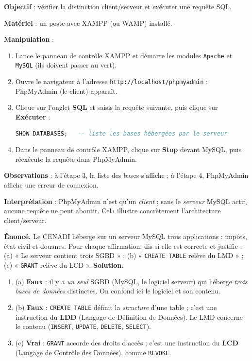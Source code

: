 \documentclass[11pt]{article}
\begin{document}
\begin{experience}
\textbf{Objectif} : vérifier la distinction client/serveur et exécuter une requête SQL.

\textbf{Matériel} : un poste avec XAMPP (ou WAMP) installé.

\textbf{Manipulation} :
\begin{enumerate}
\item Lance le panneau de contrôle XAMPP et démarre les modules \texttt{Apache} et \texttt{MySQL} (ils doivent passer au vert).
\item Ouvre le navigateur à l'adresse \texttt{http://localhost/phpmyadmin} : PhpMyAdmin (le client) apparaît.
\item Clique sur l'onglet \textbf{SQL} et saisis la requête suivante, puis clique sur \textbf{Exécuter} :
\begin{lstlisting}[language=SQL]
SHOW DATABASES;   -- liste les bases hébergées par le serveur
\end{lstlisting}
\item Dans le panneau de contrôle XAMPP, clique sur \textbf{Stop} devant MySQL, puis réexécute la requête dans PhpMyAdmin.
\end{enumerate}

\textbf{Observations} : à l'étape 3, la liste des bases s'affiche ; à l'étape 4, PhpMyAdmin affiche une erreur de connexion.

\textbf{Interprétation} : PhpMyAdmin n'est qu'un \emph{client} ; sans le \emph{serveur} MySQL actif, aucune requête ne peut aboutir. Cela illustre concrètement l'architecture client/serveur.
\end{experience}

\begin{exoresolu}
\textbf{Énoncé.} Le CENADI héberge sur un serveur MySQL trois applications : impôts, état civil et douanes. Pour chaque affirmation, dis si elle est correcte et justifie : (a) « Le serveur contient trois SGBD » ; (b) « \texttt{CREATE TABLE} relève du LMD » ; (c) « \texttt{GRANT} relève du LCD ».
\tcblower
\textbf{Solution.}
\begin{enumerate}
\item (a) \textbf{Faux} : il y a \emph{un seul} SGBD (MySQL, le logiciel serveur) qui héberge \emph{trois bases de données} distinctes. On confond ici le logiciel et son contenu.
\item (b) \textbf{Faux} : \texttt{CREATE TABLE} définit la \emph{structure} d'une table ; c'est une instruction du \textbf{LDD} (Langage de Définition de Données). Le LMD concerne le contenu (\texttt{INSERT}, \texttt{UPDATE}, \texttt{DELETE}, \texttt{SELECT}).
\item (c) \textbf{Vrai} : \texttt{GRANT} accorde des droits d'accès ; c'est une instruction du \textbf{LCD} (Langage de Contrôle des Données), comme \texttt{REVOKE}.
\end{enumerate}
\end{exoresolu}
\end{document}
